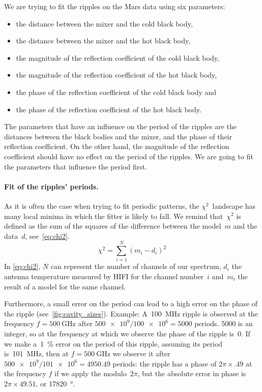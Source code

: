 We are trying to fit the ripples on the Mars data using six parameters:
\begin{itemize}
    \item the distance between the mixer and the cold black body,
    \item the distance between the mixer and the hot black body,
    \item the magnitude of the reflection coefficient of the cold black body,
    \item the magnitude of the reflection coefficient of the hot black body,
    \item the phase of the reflection coefficient of the cold black body and
    \item the phase of the reflection coefficient of the hot black body.
\end{itemize}

The parameters that have an influence on the period of the ripples are the distances between the black bodies and the mixer, and the phase of their reflection coefficient.
On the other hand, the magnitude of the reflection coefficient should have no effect on the period of the ripples.
We are going to fit the parameters that influence the period first.

\paragraph{Fit of the ripples' periods.}
As it is often the case when trying to fit periodic patterns, the $\chi^2$~landscape has many local minima in which the fitter is likely to fall.
We remind that~$\chi^2$ is defined as the sum of the squares of the difference between the model~$m$ and the data~$d$, see~\cref{eq:chi2}.
\begin{equation}
    \chi^2 = \sum_{i=1}^{N}(m_i - d_i)^2 \label{eq:chi2}
\end{equation}
In \cref{eq:chi2}, $N$ can represent the number of channels of our spectrum,
$d_i$ the antenna temperature measured by HIFI for the channel number~$i$
and~$m_i$ the result of a model for the same channel.

Furthermore, a small error on the period can lead to a high error on the phase of the ripple (see~\vref{fig:cavity_sizes}).
Example:
A~\SI{100}{\mega\hertz} ripple is observed at the frequency $f=\SI{500}{\giga\hertz}$ after $\num{500e9} / \num{100e6} = 5000$ periods.
5000 is an integer, so at the frequency at which we observe the phase of the ripple is~0.
If we make a~\SI{1}{\percent} error on the period of this ripple, assuming its period is~\SI{101}{\mega\hertz}, then at $f=\SI{500}{\giga\hertz}$ we observe it after $\num{500e9} / \num{101e6} = 4950.49$ periods: the ripple has a phase of $2\pi \times .49$ at the frequency $f$ if we apply the modulo~$2\pi$, but the absolute error in phase is $2\pi \times 49.51$, or \SI{17820}{\degree}.

